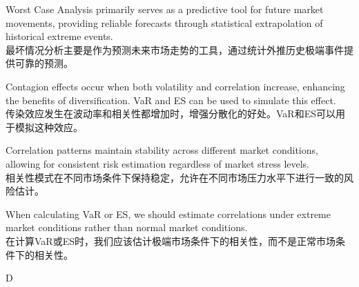 \documentclass{article}
\begin{document}
\begin{choices}
    \item Worst Case Analysis primarily serves as a predictive tool for future market movements, providing reliable forecasts through statistical extrapolation of historical extreme events.\\
    最坏情况分析主要是作为预测未来市场走势的工具，通过统计外推历史极端事件提供可靠的预测。
    
    \item Contagion effects occur when both volatility and correlation increase, enhancing the benefits of diversification. VaR and ES can be used to simulate this effect.\\
    传染效应发生在波动率和相关性都增加时，增强分散化的好处。VaR和ES可以用于模拟这种效应。
    
    \item Correlation patterns maintain stability across different market conditions, allowing for consistent risk estimation regardless of market stress levels.\\
    相关性模式在不同市场条件下保持稳定，允许在不同市场压力水平下进行一致的风险估计。
    
    \item When calculating VaR or ES, we should estimate correlations under extreme market conditions rather than normal market conditions.\\
    在计算VaR或ES时，我们应该估计极端市场条件下的相关性，而不是正常市场条件下的相关性。
\end{choices}

\begin{correctanswer}
    D
\end{correctanswer}
\end{document}
